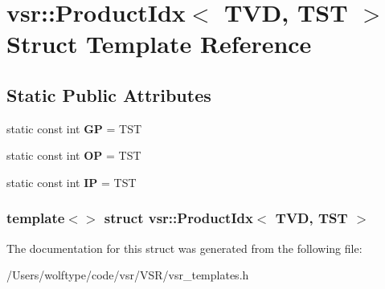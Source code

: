 \hypertarget{structvsr_1_1_product_idx_3_01_t_v_d_00_01_t_s_t_01_4}{\section{vsr\-:\-:Product\-Idx$<$ T\-V\-D, T\-S\-T $>$ Struct Template Reference}
\label{structvsr_1_1_product_idx_3_01_t_v_d_00_01_t_s_t_01_4}
}
\subsection*{Static Public Attributes}
\begin{DoxyCompactItemize}
\item 
\hypertarget{structvsr_1_1_product_idx_3_01_t_v_d_00_01_t_s_t_01_4_af9eec31061b6493b635127f559c9bb9d}{static const int {\bfseries G\-P} = T\-S\-T}\label{structvsr_1_1_product_idx_3_01_t_v_d_00_01_t_s_t_01_4_af9eec31061b6493b635127f559c9bb9d}

\item 
\hypertarget{structvsr_1_1_product_idx_3_01_t_v_d_00_01_t_s_t_01_4_a02ac534c308088390ebad75d04132b20}{static const int {\bfseries O\-P} = T\-S\-T}\label{structvsr_1_1_product_idx_3_01_t_v_d_00_01_t_s_t_01_4_a02ac534c308088390ebad75d04132b20}

\item 
\hypertarget{structvsr_1_1_product_idx_3_01_t_v_d_00_01_t_s_t_01_4_a43743f1fa4a5bfa98ced2eec8b723259}{static const int {\bfseries I\-P} = T\-S\-T}\label{structvsr_1_1_product_idx_3_01_t_v_d_00_01_t_s_t_01_4_a43743f1fa4a5bfa98ced2eec8b723259}

\end{DoxyCompactItemize}
\subsubsection*{template$<$$>$ struct vsr\-::\-Product\-Idx$<$ T\-V\-D, T\-S\-T $>$}



The documentation for this struct was generated from the following file\-:\begin{DoxyCompactItemize}
\item 
/\-Users/wolftype/code/vsr/\-V\-S\-R/vsr\-\_\-templates.\-h\end{DoxyCompactItemize}
